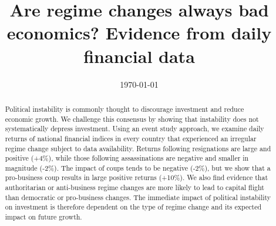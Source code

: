 \documentclass[12pt,final,fleqn]{article}
\theoremstyle{plain}
\begin{document}
\author{  }
\title{\textbf{Are regime changes always bad economics? Evidence from daily financial data}}
\date{\today}
\maketitle
\thispagestyle{empty}

\singlespacing
\begin{abstract}
\noindent
Political instability is commonly thought to discourage investment and reduce economic growth. We challenge this consensus by showing that instability does not systematically depress investment. Using an event study approach, we examine daily returns of national financial indices in every country that experienced an irregular regime change subject to data availability. Returns following resignations are large and positive (+4\%), while those following assassinations are negative and smaller in magnitude (-2\%). The impact of coups tends to be negative (-2\%), but we show that a pro-business coup results in large positive returns (+10\%). We also find evidence that authoritarian or anti-business regime changes are more likely to lead to capital flight than democratic or pro-business changes.  The immediate impact of political instability on investment is therefore dependent on the type of regime change and its expected impact on future growth. 


\end{abstract}
\doublespacing

\clearpage
{}

\newpage
\end{document}
